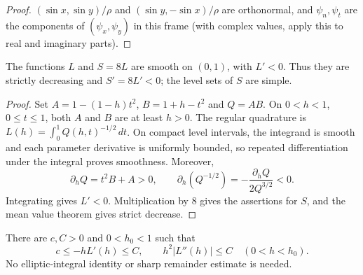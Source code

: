 \begin{proof}
\leanok
$(\sin x,\sin y)/\rho$ and $(\sin y,-\sin x)/\rho$ are orthonormal, and $\psi_n,\psi_t$ are the
components of $(\psi_x,\psi_y)$ in this frame (with complex values, apply this to real and
imaginary parts).
\end{proof}

\begin{lemma}
\label{lem:period-regularity}
\leanok
The functions $L$ and $S=8L$ are smooth on $(0,1)$, with $L'<0$.
Thus they are strictly decreasing and $S'=8L'<0$; the level sets of
$S$ are simple.
\end{lemma}

\begin{proof}
\leanok
Set $A=1-(1-h)t^2$, $B=1+h-t^2$ and $Q=AB$. On $0<h<1$,
$0\le t\le1$, both $A$ and $B$ are at least $h>0$.
The regular quadrature is $L(h)=\int_0^1 Q(h,t)^{-1/2}\,dt$.
On compact level intervals, the integrand is smooth and each parameter
derivative is uniformly bounded, so repeated differentiation under the
integral proves smoothness. Moreover,
\[
  \partial_hQ=t^2B+A>0,\qquad
  \partial_h(Q^{-1/2})=-\frac{\partial_hQ}{2Q^{3/2}}<0.
\]
Integrating gives $L'<0$. Multiplication by $8$ gives the assertions
for $S$, and the mean value theorem gives strict decrease.
\end{proof}

\begin{lemma}
\label{lem:period-derivative-bounds}
\leanok
There are $c,C>0$ and $0<h_0<1$ such that
\[
 c\le-hL'(h)\le C,\qquad h^2|L''(h)|\le C
 \quad(0<h<h_0).
\]
No elliptic-integral identity or sharp remainder estimate is needed.
\end{lemma}

